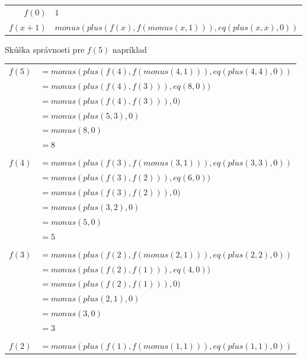\documentclass[11pt,a4paper]{article}
\begin{document}
\begin{center}
\begin{tabular}{r@{ $=$ }l}
  $f(0)$   & $1$ \\
  $f(x+1)$ & $monus(plus(f(x),f(monus(x,1))),eq(plus(x,x),0))$ \\
\end{tabular}
\end{center}

Skúška správnosti pre $f(5)$ napríklad\\

\begin{tabular}{rl}
$f(5)$\hspace{-3mm} & $= monus(plus(f(4),f(monus(4,1))),eq(plus(4,4),0))$\\
                    & $= monus(plus(f(4),f(3))),eq(8,0))$\\
                    & $= monus(plus(f(4),f(3))),0)$\\
                    & $= monus(plus(5,3),0)$\\
                    & $= monus(8,0)$\\
                    & $= 8$\\
\\[-0.5em]
$f(4)$\hspace{-3mm} & $= monus(plus(f(3),f(monus(3,1))),eq(plus(3,3),0))$\\
                    & $= monus(plus(f(3),f(2))),eq(6,0))$\\
                    & $= monus(plus(f(3),f(2))),0)$\\
                    & $= monus(plus(3,2),0)$\\
                    & $= monus(5,0)$\\
                    & $= 5$\\
\\[-0.5em]
$f(3)$\hspace{-3mm} & $= monus(plus(f(2),f(monus(2,1))),eq(plus(2,2),0))$\\
                    & $= monus(plus(f(2),f(1))),eq(4,0))$\\
                    & $= monus(plus(f(2),f(1))),0)$\\
                    & $= monus(plus(2,1),0)$\\
                    & $= monus(3,0)$\\
                    & $= 3$\\
\\[-0.5em]
$f(2)$\hspace{-3mm} & $= monus(plus(f(1),f(monus(1,1))),eq(plus(1,1),0))$\\

\end{tabular}
\end{document}
